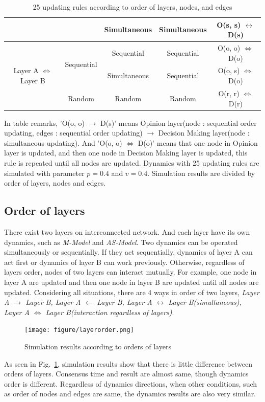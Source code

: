 \begin{table}[htp]
\begin{center}
\begin{tabular}{c|c|c|c|c}
			&                                & Simultaneous                       & Simultaneous           & O(s, s) $\leftrightarrow$ D(s) \\ \hline
			\multirow{3}{*}{Layer A $\Leftrightarrow$ Layer B}& \multirow{2}{*}{Sequential}  & Sequential                         & Sequential             & O(o, o) $\Leftrightarrow$ D(o) \\ \cline{3-5}
			&                                & Simultaneous                       & Sequential             & O(o, s) $\Leftrightarrow$ D(o) \\ \cline{2-5}
			& Random                         & Random                             & Random                 & O(r, r) $\Leftrightarrow$ D(r) \\ \hline
			
		\end{tabular}
	\end{center}
	\caption{25 updating rules according to order of layers, nodes, and edges}
	\label{table1}
\end{table}

In table remarks, 'O(o, o) $\to$ D(s)’ means Opinion layer(node : sequential order updating, edges : sequential order updating) $\to$ Decision Making layer(node : simultaneous updating). And 'O(o, o) $\Leftrightarrow$ D(o)’ means that one node in Opinion layer is updated, and then one node in Decision Making layer is updated, this rule is repeated until all nodes are updated.
Dynamics with 25 updating rules are simulated with parameter $p=0.4$ and $v=0.4$. Simulation results are divided by order of layers, nodes and edges. 

\subsection{Order of layers}
There exist two layers on interconnected network. And each layer have its own dynamics, such as \textit{M-Model} and \textit{AS-Model}. Two dynamics can be operated simultaneously or sequentially. If they act sequentially, dynamics of layer A can act first or dynamics of layer B can work previously. Otherwise, regardless of layers order, nodes of two layers can interact mutually. For example, one node in layer A are updated and then one node in layer B are updated until all nodes are updated.  
Considering all situations, there are 4 ways in order of two layers, \textit{Layer A $\to$ Layer B, Layer A $\leftarrow$ Layer B, Layer A $\leftrightarrow$ Layer B(simultaneous), Layer A $\Leftrightarrow$ Layer B(interaction regardless of layers)}. 
\begin{figure}[!htb]
	\centering
	\texttt{[image: figure/layerorder.png]}
	\caption{Simulation results according to orders of layers}
	\label{layerorder}
\end{figure}
As seen in Fig.~\ref{layerorder}, simulation results show that there is little difference between orders of layers. Consensus time and result are almost same, though dynamics order is different. Regardless of dynamics directions, when other conditions, such as order of nodes and edges are same, the dynamics results are also very similar.  

